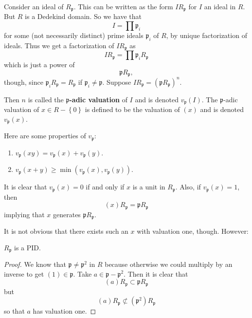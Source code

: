 Consider an ideal of $R_{\mathfrak{p}}$. This can be written as the form $I
R_{\mathfrak{p}}$ for $I$ an ideal in $R$.  But $R$ is a Dedekind domain. So we have that
\[ I = \prod \mathfrak{p}_i  \]
for some (not necessarily distinct) prime ideals $\mathfrak{p}_i$ of $R$, by unique factorization of
ideals. Thus we get a factorization of $IR_{\mathfrak{p}}$ as
\[ I R_{\mathfrak{p}} = \prod \mathfrak{p}_i R_{\mathfrak{p}}  \]
which is just a power of 
\[ \mathfrak{p}R_{\mathfrak{p}},  \]
though, since $\mathfrak{p}_i R_{\mathfrak{p}} = R_{\mathfrak{p}}$ if
$\mathfrak{p}_i \neq \mathfrak{p}$. 
Suppose $I R_{\mathfrak{p}} = (\mathfrak{p}R_{\mathfrak{p}})^n$. 
\begin{definition} 
Then $n$ is called the \textbf{$\mathfrak{p}$-adic valuation} of $I$ and is
denoted $v_{\mathfrak{p}}(I)$. The
$\mathfrak{p}$-adic valuation of $x \in R - \left\{0\right\}$ is defined to be the valuation of
$(x)$ and is denoted $v_{\mathfrak{p}}(x)$.
\end{definition} 

Here are some properties of $v_{\mathfrak{p}}$:

\begin{enumerate}
\item $v_{\mathfrak{p}}(xy) = v_{\mathfrak{p}}(x) + v_{\mathfrak{p}}(y)$.
\item $v_{\mathfrak{p}}(x+y) \geq \min (v_{\mathfrak{p}}(x),
v_{\mathfrak{p}}(y))$.
\end{enumerate}

It is clear that $v_{\mathfrak{p}}(x)=0$ if and only if $x$ is a unit in
$R_{\mathfrak{p}}$. Also, if $v_{\mathfrak{p}}(x) = 1$, then
\[ (x) R_{\mathfrak{p}} = \mathfrak{p}R_{\mathfrak{p}}  \]
implying that $x$ generates $\mathfrak{p}R_{\mathfrak{p}}$.

It is not obvious that there exists such an $x$ with valuation one, though.
However:

\begin{proposition} 
$R_{\mathfrak{p}}$ is a PID.
\end{proposition} 
\begin{proof} 
We know that $\mathfrak{p} \neq \mathfrak{p}^2$ in $R$ because otherwise we
could multiply by an inverse to get $(1) \in \mathfrak{p}$. Take $a \in
\mathfrak{p} - \mathfrak{p}^2$.  Then it is clear that 
\[ (a) R_{\mathfrak{p}} \subset \mathfrak{p}R_{\mathfrak{p}}  \]
but 
\[ (a) R_{\mathfrak{p}} \not\subset (\mathfrak{p}^2)R_{\mathfrak{p}}  \]
so that $a$ has valuation one. 
\end{proof} 


